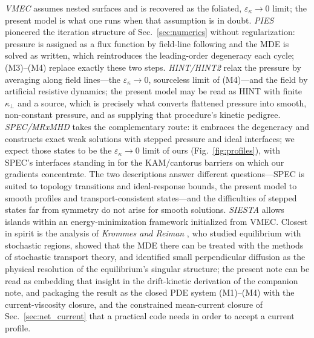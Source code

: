 \documentclass[english]{article}
\begin{document}
\emph{VMEC} \cite{hirshman1983} assumes nested surfaces and is recovered as the
foliated, $\varepsilon_\kappa\!\rightarrow\!0$ limit; the present model is what one runs when that
assumption is in doubt. \emph{PIES} \cite{reiman1986} pioneered the iteration structure of
Sec.~\ref{sec:numerics} without regularization: pressure is assigned as a flux function by
field-line following and the MDE is solved as written, which reintroduces the leading-order
degeneracy each cycle; (M3)--(M4) replace exactly these two steps. \emph{HINT/HINT2}
\cite{harafuji1989,suzuki2006} relax the pressure by averaging along field lines---the
$\varepsilon_\kappa\rightarrow0$, sourceless limit of (M4)---and the field by artificial resistive
dynamics; the present model may be read as HINT with finite $\kappa_\perp$ and a source, which is
precisely what converts flattened pressure into smooth, non-constant pressure, and as supplying
that procedure's kinetic pedigree. \emph{SPEC/MRxMHD} \cite{hudson2012} takes the complementary
route: it embraces the degeneracy and constructs exact weak solutions with stepped pressure and
ideal interfaces; we expect those states to be the $\varepsilon_\kappa\rightarrow0$ limit of ours
(Fig.~\ref{fig:profiles}), with SPEC's interfaces standing in for the KAM/cantorus barriers on
which our gradients concentrate. The two descriptions answer different questions---SPEC is suited
to topology transitions and ideal-response bounds, the present model to smooth profiles and
transport-consistent states---and the difficulties of stepped states far from symmetry
\cite{qu2021} do not arise for smooth solutions. \emph{SIESTA} \cite{hirshman2011} allows islands
within an energy-minimization framework initialized from VMEC. Closest in spirit is the analysis of
\emph{Krommes and Reiman} \cite{krommes2009}, who studied equilibrium with stochastic regions,
showed that the MDE there can be treated with the methods of stochastic transport theory, and
identified small perpendicular diffusion as the physical resolution of the equilibrium's singular
structure; the present note can be read as embedding that insight in the drift-kinetic derivation
of the companion note, and packaging the result as the closed PDE system (M1)--(M4) with the
current-viscosity closure, and the constrained mean-current closure of
Sec.~\ref{sec:net_current} that a practical code needs in order to accept a current profile.
\end{document}
